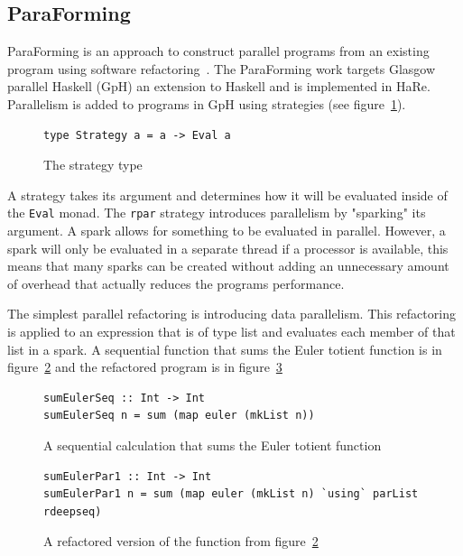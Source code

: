 \subsection{ParaForming}  
ParaForming is an approach to construct parallel programs from an existing program using software refactoring~\citep{paraforming}. The ParaForming work targets Glasgow parallel Haskell (GpH) an extension to Haskell and is implemented in HaRe. Parallelism is added to programs in GpH using strategies (see figure~\ref{strategy}). 

\begin{figure}[t]\label{strategy}
\begin{lstlisting}
type Strategy a = a -> Eval a
\end{lstlisting}
\caption{The strategy type}
\end{figure}   

A strategy takes its argument and determines how it will be evaluated inside of the \texttt{Eval} monad. The \texttt{rpar} strategy introduces parallelism by "sparking" its argument. A spark allows for something to be evaluated in parallel. However, a spark will only be evaluated in a separate thread if a processor is available, this means that many sparks can be created without adding an unnecessary amount of overhead that actually reduces the programs performance.

The simplest parallel refactoring is introducing data parallelism. This refactoring is applied to an expression that is of type list and evaluates each member of that list in a spark. A sequential function that sums the Euler totient function is in figure~\ref{eulerSeq} and the refactored program is in figure~\ref{eulerPar1}

\begin{figure}[t]\label{eulerSeq}
\begin{lstlisting}
sumEulerSeq :: Int -> Int
sumEulerSeq n = sum (map euler (mkList n))
\end{lstlisting}
\caption{A sequential calculation that sums the Euler totient function}
\end{figure} 


\begin{figure}[t]\label{eulerPar1}
\begin{lstlisting}
sumEulerPar1 :: Int -> Int
sumEulerPar1 n = sum (map euler (mkList n) `using` parList rdeepseq)
\end{lstlisting}
\caption{A refactored version of the function from figure~\ref{eulerSeq}}
\end{figure} 
  
